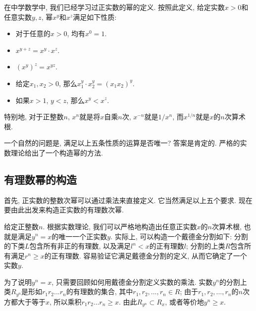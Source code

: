

在中学数学中, 我们已经学习过正实数的幂的定义. 按照此定义, 给定实数$x>0$和任意实数$y,z$, 幂$x^y$和$x^z$满足如下性质:

\begin{itemize}
\item 对于任意的$x>0$, 均有$x^0=1$.
\item $x^{y+z}=x^y\cdot x^z$.
\item $(x^y)^z=x^{yz}$.
\item 给定$x_1,x_2>0$, 那么$x_1^y\cdot x_2^y=(x_1x_2)^y$.
\item 如果$x>1$, $y<z$, 那么$x^y<x^z$.
\end{itemize}

特别地, 对于正整数$n$, $x^n$就是将$x$自乘$n$次, $x^{-n}$就是$1/x^n$, 而$x^{1/n}$就是$x$的$n$次算术根. 

一个自然的问题是, 满足以上五条性质的运算是否唯一? 答案是肯定的. 严格的实数理论给出了一个构造幂的方法.

\subsection{有理数幂的构造}

首先, 正实数的整数次幂可以通过乘法来直接定义. 它当然满足以上五个要求. 现在要由此出发来构造正实数的有理数次幂.

给定正整数$n$. 根据实数理论, 我们可以严格地构造出任意正实数$x$的$n$次算术根, 也就是满足$y^n=x$的唯一一个正实数$y$. 实际上, 可以构造一个戴德金分割如下: 分割的下类$L$包含所有非正的有理数, 以及满足$l^n<x$的正有理数$l$; 分割的上类$R$包含所有满足$r^n\geq x$的正有理数. 容易验证它满足戴德金分割的定义, 从而它确定了一个实数$y$. 

为了说明$y^n=x$, 只需要回顾如何用戴德金分割定义实数的乘法. 实数$y^n$的分割上类$R_{y^n}$是形如$r_1r_2...r_n$的有理数的集合, 其中$r_1,r_2,...,r_n\in R$; 由于$r_1,r_2,...,r_n$的$n$次方都大于等于$x$, 所以乘积$r_1r_2...r_n\geq x$. 由此$R_{y^n}\subset R_x$, 或者等价地$y^n\geq x$.